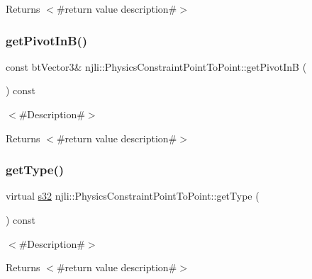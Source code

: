 \begin{DoxyReturn}{Returns}
$<$\#return value description\#$>$ 
\end{DoxyReturn}
\mbox{\label{classnjli_1_1_physics_constraint_point_to_point_aaf9a440f01231b52ff5b4e6cc390ed25}} 
\subsubsection{\texorpdfstring{get\+Pivot\+In\+B()}{getPivotInB()}}
{\footnotesize\ttfamily const bt\+Vector3\& njli\+::\+Physics\+Constraint\+Point\+To\+Point\+::get\+Pivot\+InB (\begin{DoxyParamCaption}{ }\end{DoxyParamCaption}) const}

$<$\#\+Description\#$>$

\begin{DoxyReturn}{Returns}
$<$\#return value description\#$>$ 
\end{DoxyReturn}
\mbox{\label{classnjli_1_1_physics_constraint_point_to_point_a1daae07c31eb59ee245674d465919cec}} 
\subsubsection{\texorpdfstring{get\+Type()}{getType()}}
{\footnotesize\ttfamily virtual \mbox{\hyperlink{_util_8h_aa62c75d314a0d1f37f79c4b73b2292e2}{s32}} njli\+::\+Physics\+Constraint\+Point\+To\+Point\+::get\+Type (\begin{DoxyParamCaption}{ }\end{DoxyParamCaption}) const\hspace{0.3cm}{\ttfamily [virtual]}}

$<$\#\+Description\#$>$

\begin{DoxyReturn}{Returns}
$<$\#return value description\#$>$ 
\end{DoxyReturn}


